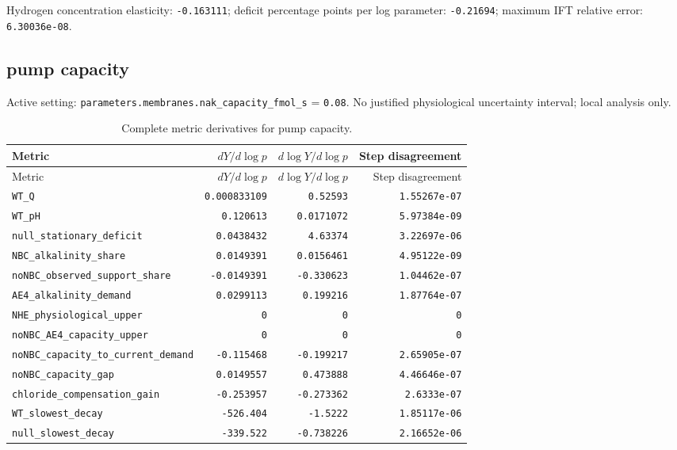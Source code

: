 Hydrogen concentration elasticity: \texttt{-0.163111}; deficit percentage points per log parameter: \texttt{-0.21694}; maximum IFT relative error: \texttt{6.30036e-08}.\par

\subsection*{pump capacity}
Active setting: \nolinkurl{parameters.membranes.nak_capacity_fmol_s} = \texttt{0.08}. No justified physiological uncertainty interval; local analysis only.


\begingroup\scriptsize
\setlength{\tabcolsep}{3pt}
\begin{longtable}{p{.44\linewidth}rrr}
\caption{Complete metric derivatives for pump capacity.}\\
\toprule
Metric & $dY/d\log p$ & $d\log Y/d\log p$ & Step disagreement \\
\midrule\endfirsthead
\toprule
Metric & $dY/d\log p$ & $d\log Y/d\log p$ & Step disagreement \\
\midrule\endhead
\bottomrule\endfoot
\nolinkurl{WT_Q} & \texttt{0.000833109} & \texttt{0.52593} & \texttt{1.55267e-07} \\
\nolinkurl{WT_pH} & \texttt{0.120613} & \texttt{0.0171072} & \texttt{5.97384e-09} \\
\nolinkurl{null_stationary_deficit} & \texttt{0.0438432} & \texttt{4.63374} & \texttt{3.22697e-06} \\
\nolinkurl{NBC_alkalinity_share} & \texttt{0.0149391} & \texttt{0.0156461} & \texttt{4.95122e-09} \\
\nolinkurl{noNBC_observed_support_share} & \texttt{-0.0149391} & \texttt{-0.330623} & \texttt{1.04462e-07} \\
\nolinkurl{AE4_alkalinity_demand} & \texttt{0.0299113} & \texttt{0.199216} & \texttt{1.87764e-07} \\
\nolinkurl{NHE_physiological_upper} & \texttt{0} & \texttt{0} & \texttt{0} \\
\nolinkurl{noNBC_AE4_capacity_upper} & \texttt{0} & \texttt{0} & \texttt{0} \\
\nolinkurl{noNBC_capacity_to_current_demand} & \texttt{-0.115468} & \texttt{-0.199217} & \texttt{2.65905e-07} \\
\nolinkurl{noNBC_capacity_gap} & \texttt{0.0149557} & \texttt{0.473888} & \texttt{4.46646e-07} \\
\nolinkurl{chloride_compensation_gain} & \texttt{-0.253957} & \texttt{-0.273362} & \texttt{2.6333e-07} \\
\nolinkurl{WT_slowest_decay} & \texttt{-526.404} & \texttt{-1.5222} & \texttt{1.85117e-06} \\
\nolinkurl{null_slowest_decay} & \texttt{-339.522} & \texttt{-0.738226} & \texttt{2.16652e-06} \\
\end{longtable}
\endgroup

